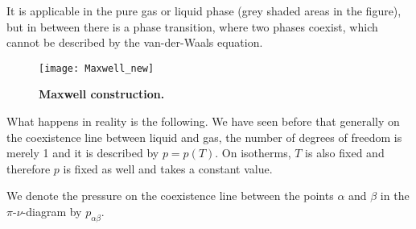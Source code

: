 It is applicable  in the pure gas or  liquid phase (grey shaded areas in the figure),
but in between there is a phase transition, where two phases coexist, which cannot be described by the van-der-Waals equation.
%
\begin{figure}[htbp]
\begin{center}
\texttt{[image: Maxwell\_new]}
\caption{\bf Maxwell construction.}
\label{fig:Maxwell}
\end{center}
\end{figure}
%


What happens in reality is the following. We have seen before that generally on the coexistence 
line between liquid and gas, the number of degrees of freedom is merely 1 and it is described by $p=p(T)$.
On isotherms, $T$ is also fixed and therefore $p$ is fixed as well and takes a constant value.

%

We denote the pressure on the coexistence line between the points $\alpha$ and $\beta$ in the 
$\pi$-$\nu$-diagram by $p_{\alpha\beta}$.

